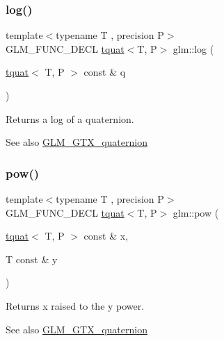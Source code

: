 \subsubsection{\texorpdfstring{log()}{log()}}
{\footnotesize\ttfamily template$<$typename T , precision P$>$ \\
G\+L\+M\+\_\+\+F\+U\+N\+C\+\_\+\+D\+E\+CL \hyperlink{structglm_1_1tquat}{tquat}$<$T, P$>$ glm\+::log (\begin{DoxyParamCaption}\item[{\hyperlink{structglm_1_1tquat}{tquat}$<$ T, P $>$ const \&}]{q }\end{DoxyParamCaption})}

Returns a log of a quaternion.

\begin{DoxySeeAlso}{See also}
\hyperlink{group__gtx__quaternion}{G\+L\+M\+\_\+\+G\+T\+X\+\_\+quaternion} 
\end{DoxySeeAlso}
\mbox{\label{group__gtx__quaternion_ga42a0cf206c59eaeff4c67dd62e09a580}} 
\subsubsection{\texorpdfstring{pow()}{pow()}}
{\footnotesize\ttfamily template$<$typename T , precision P$>$ \\
G\+L\+M\+\_\+\+F\+U\+N\+C\+\_\+\+D\+E\+CL \hyperlink{structglm_1_1tquat}{tquat}$<$T, P$>$ glm\+::pow (\begin{DoxyParamCaption}\item[{\hyperlink{structglm_1_1tquat}{tquat}$<$ T, P $>$ const \&}]{x,  }\item[{T const \&}]{y }\end{DoxyParamCaption})}

Returns x raised to the y power.

\begin{DoxySeeAlso}{See also}
\hyperlink{group__gtx__quaternion}{G\+L\+M\+\_\+\+G\+T\+X\+\_\+quaternion} 
\end{DoxySeeAlso}
\mbox{\label{group__gtx__quaternion_ga9f39f0d3ecd66839a4af44560aa10fb2}} 
